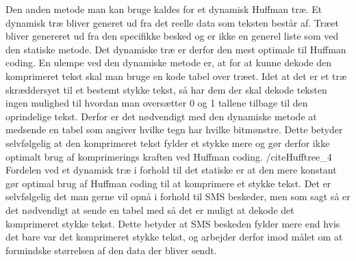 Den anden metode man kan bruge kaldes for et dynamisk Huffman træ. Et dynamisk træ bliver generet ud fra det reelle data som teksten består af. Træet bliver genereret ud fra den specifikke besked og er ikke en generel liste som ved den statiske metode. Det dynamiske træ er derfor den mest optimale til Huffman coding.
En ulempe ved den dynamiske metode er, at for at kunne dekode den komprimeret tekst  skal man bruge en kode tabel over træet. Idet at det er et træ skræddersyet til et bestemt stykke tekst, så har dem der skal dekode teksten ingen mulighed til hvordan man oversætter 0 og 1 tallene tilbage til den oprindelige tekst. Derfor er det nødvendigt med den dynamiske metode at medsende en tabel som angiver hvilke tegn har hvilke bitmønstre. Dette betyder selvfølgelig at den komprimeret tekst fylder et stykke mere og gør derfor ikke optimalt brug af komprimerings kraften ved Huffman coding. /cite{Hufftree_4}
Fordelen ved et dynamisk træ i forhold til det statiske er at den mere konstant gør optimal brug af Huffman coding til at komprimere et stykke tekst. Det er selvfølgelig det man gerne vil opnå i forhold til SMS beskeder, men som sagt så er det nødvendigt at sende en tabel med så det er muligt at dekode det komprimeret stykke tekst. Dette betyder at SMS beskeden fylder mere end hvis det bare var det komprimeret stykke tekst, og arbejder derfor imod målet om at formindske størrelsen af den data der bliver sendt.